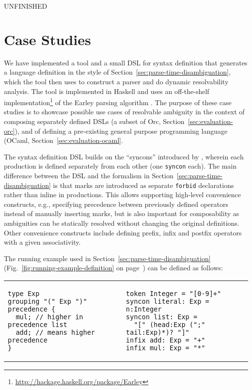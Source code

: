 \documentclass[acmsmall,review,anonymous]{acmart}\settopmatter{printfolios=true,printccs=false,printacmref=false}
\newcommand{\syncon}{\lstinline[language=syncon]}
\begin{document}
UNFINISHED

\section{Case Studies} \label{sec:evaluation}


We have implemented a tool and a small DSL for syntax definition
that generates a language definition in the style of
Section~\ref{sec:parse-time-disambiguation}, which the tool then
uses to construct a parser and do dynamic resolvability analysis.
The tool is implemented in Haskell and uses an off-the-shelf
implementation\footnote{\url{http://hackage.haskell.org/package/Earley}}
of the Earley parsing algorithm
\cite{earleyEfficientContextfreeParsing1970}. The purpose of these
case studies is to showcase possible use cases of resolvable
ambiguity in the context of composing separately defined DSLs (a
subset of Orc, Section~\ref{sec:evaluation-orc}), and of defining
a pre-existing general purpose programming language (OCaml,
Section~\ref{sec:evaluation-ocaml}.

The syntax definition DSL builds on the ``syncons'' introduced by
\citet{palmkvistCreatingDomainSpecificLanguages2019}, wherein each
production is defined separately from each other (one
\syncon{syncon} each).
%
The main difference between the DSL and the formalism in
Section~\ref{sec:parse-time-disambiguation} is that marks are
introduced as separate \syncon{forbid} declarations rather than
inline in productions. This allows supporting high-level
convenience constructs, e.g., specifying precedence between
previously defined operators instead of manually inserting marks,
but is also important for composability as ambiguities can be
statically resolved without changing the original definitions.
Other convenience constructs include defining prefix, infix and
postfix operators with a given associativity.

The running example used in
Section~\ref{sec:parse-time-disambiguation}
(Fig.~\ref{fig:running-example-definition} on
page~\pageref{fig:running-example-definition}) can be defined as
follows:

\begin{tabular}{ll}
\begin{lstlisting}[language=syncon,boxpos=t]
type Exp
grouping "(" Exp ")"
precedence {
  mul; // higher in precedence list
  add; // means higher precedence
}
\end{lstlisting}
&
\begin{lstlisting}[language=syncon,boxpos=t]
token Integer = "[0-9]+"
syncon literal: Exp = n:Integer
syncon list: Exp =
  "[" (head:Exp (";" tail:Exp)*)? "]"
infix add: Exp = "+"
infix mul: Exp = "*"
\end{lstlisting}
\end{tabular}\smallskip
\end{document}
